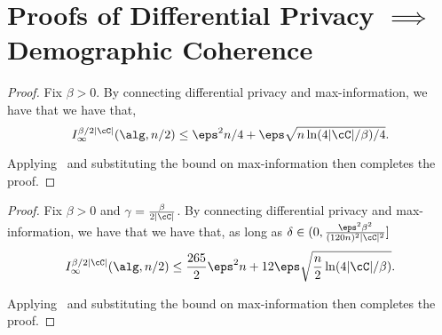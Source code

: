 
\section{Proofs of Differential Privacy $\implies$ Demographic Coherence}\label{sec:DPdemcoh}
\pureDPcoh

\begin{proof}

    Fix $\beta > 0$. By  connecting differential privacy and max-information, we have that we have that,
    $$I^{\beta/2|\cC|}_{\infty}(\alg,n/2) \leq \eps^2n/4 + \eps\sqrt{n\ln(4|\cC|/\beta)/4}.$$

    Applying~ and substituting the bound on max-information then completes the proof.
\end{proof}

\approxDPcoh

\begin{proof}
  Fix $\beta > 0$ and $\gamma = \frac{\beta}{2|\cC|}$. By  connecting differential privacy and max-information, we have that we have that, as long as $\delta \in (0, \frac{\eps^2 \beta^2}{(120n)^2 |\cC|^2}]$ 
  \begin{align*}
  I^{\beta/2|\cC|}_{\infty}(\alg,n/2) \leq \frac{265}{2} \eps^2n + 12\eps\sqrt{\frac{n}{2}\ln(4|\cC|/\beta)}. 
  \end{align*}

    Applying~ and substituting the bound on max-information then completes the proof.
    
\end{proof}